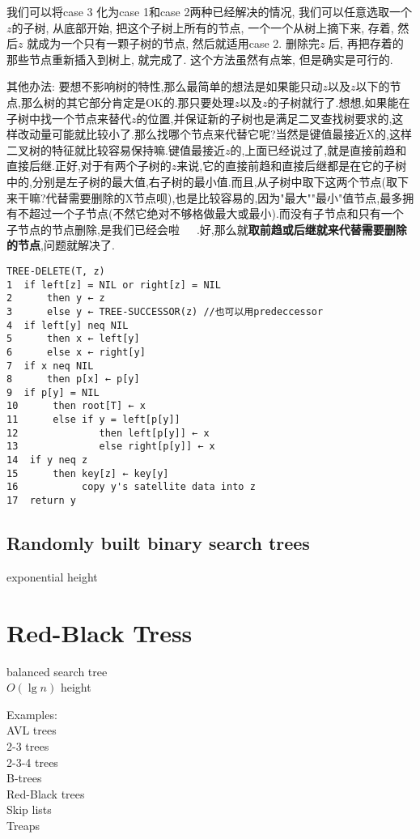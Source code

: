 \documentclass{article}
\begin{document}
我们可以将case 3 化为case 1和case 2两种已经解决的情况, 我们可以任意选取一个$z$的子树, 从底部开始, 把这个子树上所有的节点, 一个一个从树上摘下来, 存着, 然后$z$ 就成为一个只有一颗子树的节点, 然后就适用case 2. 删除完$z$ 后, 再把存着的那些节点重新插入到树上, 就完成了. 这个方法虽然有点笨, 但是确实是可行的.

其他办法: 要想不影响树的特性,那么最简单的想法是如果能只动$z$以及$z$以下的节点,那么树的其它部分肯定是OK的.那只要处理$z$以及$z$的子树就行了.想想,如果能在子树中找一个节点来替代$z$的位置,并保证新的子树也是满足二叉查找树要求的,这样改动量可能就比较小了.那么找哪个节点来代替它呢?当然是键值最接近X的,这样二叉树的特征就比较容易保持嘛.键值最接近$z$的,上面已经说过了,就是直接前趋和直接后继.正好,对于有两个子树的$z$来说,它的直接前趋和直接后继都是在它的子树中的,分别是左子树的最大值,右子树的最小值.而且,从子树中取下这两个节点(取下来干嘛?代替需要删除的X节点呗),也是比较容易的,因为"最大""最小"值节点,最多拥有不超过一个子节点(不然它绝对不够格做最大或最小).而没有子节点和只有一个子节点的节点删除,是我们已经会啦~~~.好,那么就\textbf{取前趋或后继就来代替需要删除的节点},问题就解决了.

\begin{verbatim}
TREE-DELETE(T, z)
1  if left[z] = NIL or right[z] = NIL
2      then y ← z
3      else y ← TREE-SUCCESSOR(z) //也可以用predeccessor
4  if left[y] neq NIL
5      then x ← left[y]
6      else x ← right[y]
7  if x neq NIL
8      then p[x] ← p[y]
9  if p[y] = NIL
10      then root[T] ← x
11      else if y = left[p[y]]
12              then left[p[y]] ← x
13              else right[p[y]] ← x
14  if y neq z
15      then key[z] ← key[y]
16           copy y's satellite data into z
17  return y
\end{verbatim}

\subsection{Randomly built binary search trees}
exponential height

\section{Red-Black Tress}
\noindent balanced search tree\\
$O(\lg n)$ height

\noindent Examples:\\
AVL trees\\
2-3 trees\\
2-3-4 trees\\
B-trees\\
Red-Black trees\\
Skip lists\\
Treaps
\end{document}
